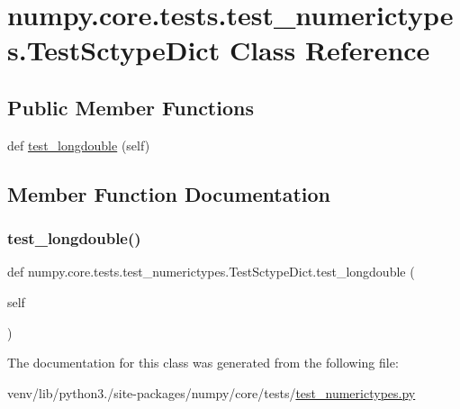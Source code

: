 \hypertarget{classnumpy_1_1core_1_1tests_1_1test__numerictypes_1_1TestSctypeDict}{}\section{numpy.\+core.\+tests.\+test\+\_\+numerictypes.\+Test\+Sctype\+Dict Class Reference}
\label{classnumpy_1_1core_1_1tests_1_1test__numerictypes_1_1TestSctypeDict}
\subsection*{Public Member Functions}
\begin{DoxyCompactItemize}
\item 
def \hyperlink{classnumpy_1_1core_1_1tests_1_1test__numerictypes_1_1TestSctypeDict_ad72a4c762418a337056b3291b91b860d}{test\+\_\+longdouble} (self)
\end{DoxyCompactItemize}


\subsection{Member Function Documentation}
\mbox{\label{classnumpy_1_1core_1_1tests_1_1test__numerictypes_1_1TestSctypeDict_ad72a4c762418a337056b3291b91b860d}} 
\subsubsection{\texorpdfstring{test\+\_\+longdouble()}{test\_longdouble()}}
{\footnotesize\ttfamily def numpy.\+core.\+tests.\+test\+\_\+numerictypes.\+Test\+Sctype\+Dict.\+test\+\_\+longdouble (\begin{DoxyParamCaption}\item[{}]{self }\end{DoxyParamCaption})}



The documentation for this class was generated from the following file\+:\begin{DoxyCompactItemize}
\item 
venv/lib/python3./site-\/packages/numpy/core/tests/\hyperlink{test__numerictypes_8py}{test\+\_\+numerictypes.\+py}\end{DoxyCompactItemize}
